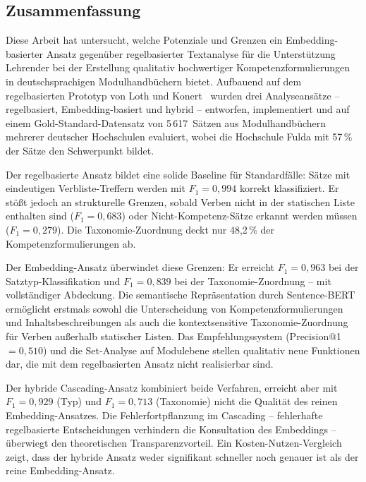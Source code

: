 
\subsection{Zusammenfassung}\label{sec:zusammenfassung}

Diese Arbeit hat untersucht, welche Potenziale und Grenzen ein Embedding-basierter Ansatz gegenüber regelbasierter Textanalyse für die Unterstützung Lehrender bei der Erstellung qualitativ hochwertiger Kompetenzformulierungen in deutschsprachigen Modulhandbüchern bietet.
Aufbauend auf dem regelbasierten Prototyp von Loth und Konert~\cite{loth2022kompetenzeditor} wurden drei Analyseansätze -- regelbasiert, Embedding-basiert und hybrid -- entworfen, implementiert und auf einem Gold-Standard-Datensatz von 5\,617~Sätzen aus Modulhandbüchern mehrerer deutscher Hochschulen evaluiert, wobei die Hochschule Fulda mit 57\,\% der Sätze den Schwerpunkt bildet.

Der regelbasierte Ansatz bildet eine solide Baseline für Standardfälle: Sätze mit eindeutigen Verbliste-Treffern werden mit $F_1 = 0{,}994$ korrekt klassifiziert.
Er stößt jedoch an strukturelle Grenzen, sobald Verben nicht in der statischen Liste enthalten sind ($F_1 = 0{,}683$) oder Nicht-Kompetenz-Sätze erkannt werden müssen ($F_1 = 0{,}279$).
Die Taxonomie-Zuordnung deckt nur 48{,}2\,\% der Kompetenzformulierungen ab.

Der Embedding-Ansatz überwindet diese Grenzen: Er erreicht $F_1 = 0{,}963$ bei der Satztyp-Klassifikation und $F_1 = 0{,}839$ bei der Taxonomie-Zuordnung -- mit vollständiger Abdeckung.
Die semantische Repräsentation durch Sentence-BERT ermöglicht erstmals sowohl die Unterscheidung von Kompetenzformulierungen und Inhaltsbeschreibungen als auch die kontextsensitive Taxonomie-Zuordnung für Verben außerhalb statischer Listen.
Das Empfehlungssystem (Precision@1 $= 0{,}510$) und die Set-Analyse auf Modulebene stellen qualitativ neue Funktionen dar, die mit dem regelbasierten Ansatz nicht realisierbar sind.

Der hybride Cascading-Ansatz kombiniert beide Verfahren, erreicht aber mit $F_1 = 0{,}929$ (Typ) und $F_1 = 0{,}713$ (Taxonomie) nicht die Qualität des reinen Embedding-Ansatzes.
Die Fehlerfortpflanzung im Cascading -- fehlerhafte regelbasierte Entscheidungen verhindern die Konsultation des Embeddings -- überwiegt den theoretischen Transparenzvorteil.
Ein Kosten-Nutzen-Vergleich zeigt, dass der hybride Ansatz weder signifikant schneller noch genauer ist als der reine Embedding-Ansatz.

